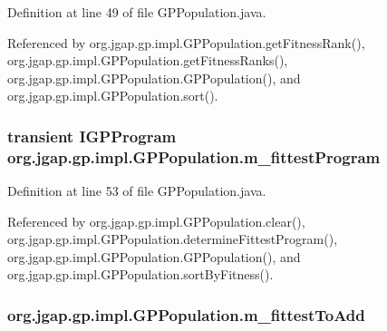 Definition at line 49 of file G\-P\-Population.\-java.



Referenced by org.\-jgap.\-gp.\-impl.\-G\-P\-Population.\-get\-Fitness\-Rank(), org.\-jgap.\-gp.\-impl.\-G\-P\-Population.\-get\-Fitness\-Ranks(), org.\-jgap.\-gp.\-impl.\-G\-P\-Population.\-G\-P\-Population(), and org.\-jgap.\-gp.\-impl.\-G\-P\-Population.\-sort().

\hypertarget{classorg_1_1jgap_1_1gp_1_1impl_1_1_g_p_population_a13678da0768ccaf2dc3b5a892c434cb7}{
\subsubsection[{m\-\_\-fittest\-Program}]{\setlength{\rightskip}{0pt plus 5cm}transient {\bf I\-G\-P\-Program} org.\-jgap.\-gp.\-impl.\-G\-P\-Population.\-m\-\_\-fittest\-Program\hspace{0.3cm}{\ttfamily [private]}}}\label{classorg_1_1jgap_1_1gp_1_1impl_1_1_g_p_population_a13678da0768ccaf2dc3b5a892c434cb7}


Definition at line 53 of file G\-P\-Population.\-java.



Referenced by org.\-jgap.\-gp.\-impl.\-G\-P\-Population.\-clear(), org.\-jgap.\-gp.\-impl.\-G\-P\-Population.\-determine\-Fittest\-Program(), org.\-jgap.\-gp.\-impl.\-G\-P\-Population.\-G\-P\-Population(), and org.\-jgap.\-gp.\-impl.\-G\-P\-Population.\-sort\-By\-Fitness().

\hypertarget{classorg_1_1jgap_1_1gp_1_1impl_1_1_g_p_population_afeeb7ca5a1210d473c18fdfe84844811}{
\subsubsection[{m\-\_\-fittest\-To\-Add}]{ org.\-jgap.\-gp.\-impl.\-G\-P\-Population.\-m\-\_\-fittest\-To\-Add\hspace{0.3cm}{\ttfamily [private]}}}\label{classorg_1_1jgap_1_1gp_1_1impl_1_1_g_p_population_afeeb7ca5a1210d473c18fdfe84844811}


